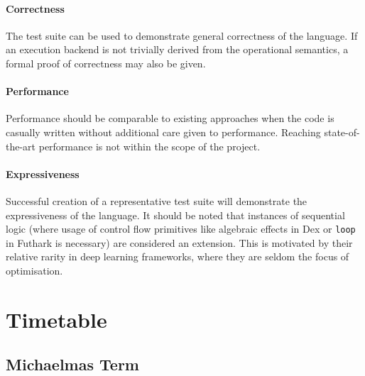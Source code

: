 \paragraph{Correctness} The test suite can be used to demonstrate general correctness of the language. If an execution backend is not trivially derived from the operational semantics, a formal proof of correctness may also be given.

\paragraph{Performance} Performance should be comparable to existing approaches when the code is casually written without additional care given to performance. Reaching state-of-the-art performance is not within the scope of the project.

\paragraph{Expressiveness} Successful creation of a representative test suite will demonstrate the expressiveness of the language. It should be noted that instances of sequential logic (where usage of control flow primitives like algebraic effects in Dex or \texttt{loop} in Futhark is necessary) are considered an extension. This is motivated by their relative rarity in deep learning frameworks, where they are seldom the focus of optimisation.


\section{Timetable}

\subsection{Michaelmas Term}

